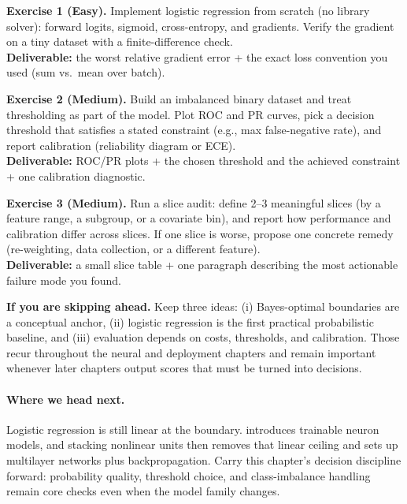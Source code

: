 \begin{tcolorbox}[summarybox, title={Exercises}]
\textbf{Exercise 1 (Easy).} Implement logistic regression from scratch (no library solver): forward logits, sigmoid, cross\hyp{}entropy, and gradients. Verify the gradient on a tiny dataset with a finite-difference check. \\
\textbf{Deliverable:} the worst relative gradient error + the exact loss convention you used (sum vs.\ mean over batch).

\smallskip
\textbf{Exercise 2 (Medium).} Build an imbalanced binary dataset and treat thresholding as part of the model. Plot ROC and PR curves, pick a decision threshold that satisfies a stated constraint (e.g., max false-negative rate), and report calibration (reliability diagram or ECE). \\
\textbf{Deliverable:} ROC/PR plots + the chosen threshold and the achieved constraint + one calibration diagnostic.

\smallskip
\textbf{Exercise 3 (Medium).} Run a slice audit: define 2--3 meaningful slices (by a feature range, a subgroup, or a covariate bin), and report how performance and calibration differ across slices. If one slice is worse, propose one concrete remedy (re-weighting, data collection, or a different feature). \\
\textbf{Deliverable:} a small slice table + one paragraph describing the most actionable failure mode you found.
\par\medskip
\noindent\textbf{If you are skipping ahead.} Keep three ideas: (i) Bayes-optimal boundaries are a conceptual anchor, (ii) logistic regression is the first practical probabilistic baseline, and (iii) evaluation depends on costs, thresholds, and calibration. Those recur throughout the neural and deployment chapters and remain important whenever later chapters output scores that must be turned into decisions.
\end{tcolorbox}

\medskip
\paragraph{Where we head next.} Logistic regression is still linear at the boundary.  introduces trainable neuron models, and stacking nonlinear units then removes that linear ceiling and sets up multilayer networks plus backpropagation. Carry this chapter's decision discipline forward: probability quality, threshold choice, and class-imbalance handling remain core checks even when the model family changes.
